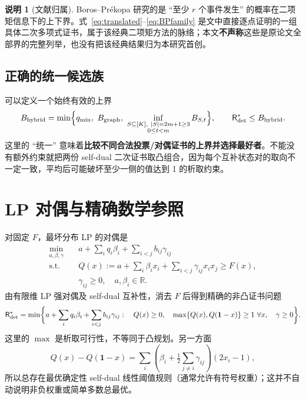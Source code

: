\documentclass[11pt,a4paper]{ctexart}
\theoremstyle{definition}
\newtheorem{remark}[theorem]{说明}
\newcommand{\Risk}{\mathsf R}
\newcommand{\bbone}{\mathbf 1}
\begin{document}
\begin{remark}[文献归属]
Boros--Pr\'{e}kopa \cite{BorosPrekopa1989} 研究的是 ``至少 $r$ 个事件发生'' 的概率在二项矩信息下的上下界。式~\eqref{eq:translated}--\eqref{eq:BPfamily} 是文中直接逐点证明的一组具体二次多项式证书，属于该经典二项矩方法的脉络；本文\textbf{不声称}这些是原论文全部界的完整列举，也没有把该经典结果归为本研究首创。
\end{remark}

\subsection{正确的统一候选族}
可以定义一个始终有效的上界
\begin{equation}\label{eq:hybrid}
B_{\rm hybrid}=\min\Bigl\{q_{\min},\ B_{\rm graph},\
\inf_{\substack{S\subseteq[K],\ |S|=2m+1\ge3\\0\le t<m}}B_{S,t}\Bigr\},
\qquad \Risk_{\rm det}^*\le B_{\rm hybrid}.
\end{equation}
这里的 ``统一'' 意味着\textbf{比较不同合法投票/对偶证书的上界并选择最好者}。不能没有额外约束就把两份 self-dual 二次证书取凸组合，因为每个互补状态对的取向不一定一致，平均后可能破坏至少一侧的值达到 1 的析取约束。

\section{LP 对偶与精确数学参照}
对固定 $F$，最坏分布 LP 的对偶是
\begin{equation}\label{eq:dual}
\begin{aligned}
\min_{a,\beta,\gamma}\quad &a+\sum_iq_i\beta_i+\sum_{i<j}b_{ij}\gamma_{ij}\\
\mathrm{s.t.}\quad &Q(x):=a+\sum_i\beta_ix_i+\sum_{i<j}\gamma_{ij}x_ix_j\ge F(x),\\
&\gamma_{ij}\ge0,\quad a,\beta_i\in\mathbb R.
\end{aligned}
\end{equation}
由有限维 LP 强对偶及 self-dual 互补性，消去 $F$ 后得到精确的非凸证书问题
\begin{equation}\label{eq:exactQ}
\Risk_{\rm det}^*=\min\biggl\{a+\sum_iq_i\beta_i+\sum_{i<j}b_{ij}\gamma_{ij}:\quad
Q(x)\ge0,\quad
\max\{Q(x),Q(\bbone-x)\}\ge1\ \forall x,\quad\gamma\ge0\biggr\}.
\end{equation}
这里的 $\max$ 是析取可行性，不等同于凸规划。另一方面
\begin{equation}\label{eq:lin}
Q(x)-Q(\bbone-x)
=\sum_i\left(\beta_i+\tfrac12\sum_{j\ne i}\gamma_{ij}\right)(2x_i-1),
\end{equation}
所以总存在最优确定性 self-dual 线性阈值规则（通常允许有符号权重）；这并不自动说明非负权重或简单多数总最优。
\end{document}
